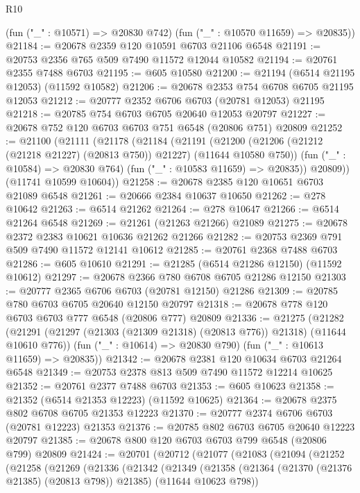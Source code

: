 \begin{lexlean}{R10}
\begin{coremodule}
{{{{{{{{{{{{{{{{{{{{{{{{{{{{{{{{{{{{{{{{{{{{{{{{{{{{{{{{{{{{{{{{{{{{{{{{{{{{{{{{{{{{      (fun ("_" : @10571) => @20830 @742)
      (fun ("_" : @10570 @11659) => @20835))
@21184 := @20678 @2359 @120 @10591 @6703 @21106 @6548
@21191 := @20753 @2356 @765 @509 @7490 @11572 @12044 @10582
@21194 := @20761 @2355 @7488 @6703
@21195 := @605 @10580
@21200 := @21194 (@6514 @21195 @12053) (@11592 @10582)
@21206 := @20678 @2353 @754 @6708 @6705 @21195 @12053
@21212 := @20777 @2352 @6706 @6703 (@20781 @12053) @21195
@21218 := @20785 @754 @6703 @6705 @20640 @12053 @20797
@21227 := @20678 @752 @120 @6703 @6703 @751 @6548 (@20806 @751) @20809
@21252 := @21100
    (@21111
      (@21178
        (@21184
          (@21191
            (@21200 (@21206 (@21212 (@21218 @21227) (@20813 @750)) @21227) (@11644 @10580 @750))
            (fun ("_" : @10584) => @20830 @764)
            (fun ("_" : @10583 @11659) => @20835))
          @20809))
      (@11741 @10599 @10604))
@21258 := @20678 @2385 @120 @10651 @6703 @21089 @6548
@21261 := @20666 @2384 @10637 @10650
@21262 := @278 @10642
@21263 := @6514 @21262
@21264 := @278 @10647
@21266 := @6514 @21264 @6548
@21269 := @21261 (@21263 @21266) @21089
@21275 := @20678 @2372 @2383 @10621 @10636 @21262 @21266
@21282 := @20753 @2369 @791 @509 @7490 @11572 @12141 @10612
@21285 := @20761 @2368 @7488 @6703
@21286 := @605 @10610
@21291 := @21285 (@6514 @21286 @12150) (@11592 @10612)
@21297 := @20678 @2366 @780 @6708 @6705 @21286 @12150
@21303 := @20777 @2365 @6706 @6703 (@20781 @12150) @21286
@21309 := @20785 @780 @6703 @6705 @20640 @12150 @20797
@21318 := @20678 @778 @120 @6703 @6703 @777 @6548 (@20806 @777) @20809
@21336 := @21275
    (@21282
      (@21291 (@21297 (@21303 (@21309 @21318) (@20813 @776)) @21318) (@11644 @10610 @776))
      (fun ("_" : @10614) => @20830 @790)
      (fun ("_" : @10613 @11659) => @20835))
@21342 := @20678 @2381 @120 @10634 @6703 @21264 @6548
@21349 := @20753 @2378 @813 @509 @7490 @11572 @12214 @10625
@21352 := @20761 @2377 @7488 @6703
@21353 := @605 @10623
@21358 := @21352 (@6514 @21353 @12223) (@11592 @10625)
@21364 := @20678 @2375 @802 @6708 @6705 @21353 @12223
@21370 := @20777 @2374 @6706 @6703 (@20781 @12223) @21353
@21376 := @20785 @802 @6703 @6705 @20640 @12223 @20797
@21385 := @20678 @800 @120 @6703 @6703 @799 @6548 (@20806 @799) @20809
@21424 := @20701
    (@20712
      (@21077
        (@21083
          (@21094
            (@21252
              (@21258
                (@21269
                  (@21336
                    (@21342
                      (@21349
                        (@21358
                          (@21364 (@21370 (@21376 @21385) (@20813 @798)) @21385)
                          (@11644 @10623 @798))
}}}}}}}}}}}}}}}}}}}}}}}}}}}}}}}}}}}}}}}}}}}}}}}}}}}}}}}}}}}}}}}}}}}}}}}}}}}}}}}}}}}}
\end{coremodule}
\end{lexlean}
